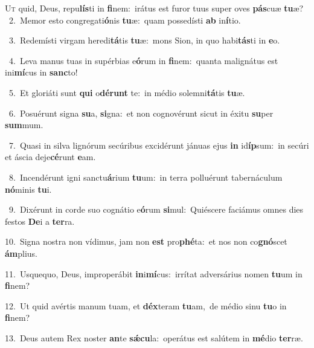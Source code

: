 \lettrine{\initial\textcolor{\initialcolor}{U}}{t} quid, Deus, repu\-\textbf{lís}\-ti in \textbf{fi}\-nem:~\star irátus est furor tuus super oves \textbf{pás}\-cuæ \textbf{tu}\-æ?\\
{\numbfont\textcolor{\numbcolor}{~2.}}~Memor esto congregati\-\textbf{ó}\-nis \textbf{tu}\-æ:~\star quam possedísti \textbf{ab} in\-\textbf{í}\-tio.\par
{\numbfont\textcolor{\numbcolor}{~3.}}~Redemísti virgam heredi\-\textbf{tá}\-tis \textbf{tu}\-æ:~\star mons Sion, in quo habi\-\textbf{tás}\-ti in \textbf{e}\-o.\par
{\numbfont\textcolor{\numbcolor}{~4.}}~Leva manus tuas in supérbias e\-\textbf{ó}\-rum in \textbf{fi}\-nem:~\star quanta malignátus est ini\-\textbf{mí}\-cus in \textbf{sanc}\-to!\par
{\numbfont\textcolor{\numbcolor}{~5.}}~Et gloriáti sunt \textbf{qui} o\-\textbf{dé}\-\textbf{runt} te:~\star in médio solemni\-\textbf{tá}\-tis \textbf{tu}\-æ.\par
{\numbfont\textcolor{\numbcolor}{~6.}}~Posuérunt signa \textbf{su}\-a, \textbf{si}\-gna:~\star et non cognovérunt sicut in éxitu \textbf{su}\-per \textbf{sum}\-mum.\par
{\numbfont\textcolor{\numbcolor}{~7.}}~Quasi in silva lignórum secúribus excidérunt jánuas ejus \textbf{in} id\-\textbf{íp}\-sum:~\star in secúri et áscia deje\-\textbf{cé}\-runt \textbf{e}\-am.\par
{\numbfont\textcolor{\numbcolor}{~8.}}~Incendérunt igni sanctu\-\textbf{á}\-rium \textbf{tu}\-um:~\star in terra polluérunt tabernáculum \textbf{nó}\-minis \textbf{tu}\-i.\par
{\numbfont\textcolor{\numbcolor}{~9.}}~Dixérunt in corde suo cognátio e\-\textbf{ó}\-rum \textbf{si}\-mul:~\star Quiéscere faciámus omnes dies festos \textbf{De}\-i a \textbf{ter}\-ra.\par
{\numbfont\textcolor{\numbcolor}{10.}}~Signa nostra non vídimus, jam non \textbf{est} pro\-\textbf{phé}\-ta:~\star et nos non co\-\textbf{gnó}\-scet \textbf{ám}\-plius.\par
{\numbfont\textcolor{\numbcolor}{11.}}~Usquequo, Deus, improperábit \textbf{in}\-i\-\textbf{mí}\-cus:~\star irrítat adversárius nomen \textbf{tu}\-um in \textbf{fi}\-nem?\par
{\numbfont\textcolor{\numbcolor}{12.}}~Ut quid avértis manum tuam, et \textbf{déx}\-teram \textbf{tu}\-am,~\star de médio sinu \textbf{tu}\-o in \textbf{fi}\-nem?\par
{\numbfont\textcolor{\numbcolor}{13.}}~Deus autem Rex noster \textbf{an}\-te \textbf{sǽ}\-\textbf{cu}la:~\star operátus est salútem in \textbf{mé}\-dio \textbf{ter}\-ræ.\par
